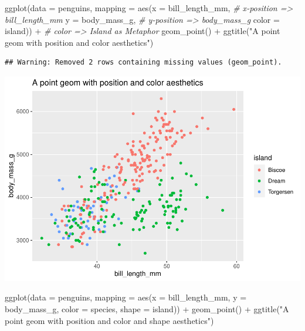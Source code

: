 \documentclass[
]{article}
\newenvironment{Shaded}{\begin{snugshade}}{\end{snugshade}}
\newcommand{\AttributeTok}[1]{\textcolor[rgb]{0.77,0.63,0.00}{#1}}
\newcommand{\CommentTok}[1]{\textcolor[rgb]{0.56,0.35,0.01}{\textit{#1}}}
\newcommand{\FunctionTok}[1]{\textcolor[rgb]{0.00,0.00,0.00}{#1}}
\newcommand{\NormalTok}[1]{#1}
\newcommand{\SpecialCharTok}[1]{\textcolor[rgb]{0.00,0.00,0.00}{#1}}
\newcommand{\StringTok}[1]{\textcolor[rgb]{0.31,0.60,0.02}{#1}}
\begin{document}
\begin{Shaded}
\begin{Highlighting}[]
\FunctionTok{ggplot}\NormalTok{(}\AttributeTok{data =}\NormalTok{ penguins, }
       \AttributeTok{mapping =} \FunctionTok{aes}\NormalTok{(}\AttributeTok{x =}\NormalTok{ bill\_length\_mm, }\CommentTok{\# x{-}position =\textgreater{} bill\_length\_mm}
                     \AttributeTok{y =}\NormalTok{ body\_mass\_g, }\CommentTok{\# y{-}position =\textgreater{} body\_mass\_g}
                     \AttributeTok{color =}\NormalTok{ island)) }\SpecialCharTok{+} \CommentTok{\# color =\textgreater{} Island as Metaphor}
  \FunctionTok{geom\_point}\NormalTok{() }\SpecialCharTok{+}
  \FunctionTok{ggtitle}\NormalTok{(}\StringTok{"A point geom with position and color aesthetics"}\NormalTok{)}
\end{Highlighting}
\end{Shaded}

\begin{verbatim}
## Warning: Removed 2 rows containing missing values (geom_point).
\end{verbatim}

\includegraphics{Grammar-of-Graphics_files/figure-latex/geom_point_position_colour-1.pdf}

\begin{Shaded}
\begin{Highlighting}[]
\FunctionTok{ggplot}\NormalTok{(}\AttributeTok{data =}\NormalTok{ penguins, }
       \AttributeTok{mapping =} \FunctionTok{aes}\NormalTok{(}\AttributeTok{x =}\NormalTok{ bill\_length\_mm, }
                     \AttributeTok{y =}\NormalTok{ body\_mass\_g, }
                     \AttributeTok{color =}\NormalTok{ species, }
                     \AttributeTok{shape =}\NormalTok{ island)) }\SpecialCharTok{+}
  \FunctionTok{geom\_point}\NormalTok{() }\SpecialCharTok{+}
  \FunctionTok{ggtitle}\NormalTok{(}\StringTok{"A point geom with position and color and shape aesthetics"}\NormalTok{)}
\end{Highlighting}
\end{Shaded}
\end{document}
